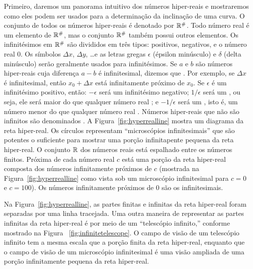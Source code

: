 \documentclass{svmono}
\begin{document}
Primeiro, daremos um panorama intuitivo dos números hiper-reais e
mostraremos como eles podem ser usados para a determinação da
inclinação de uma curva. O conjunto de todos os números hiper-reais
é denotado por ${\mathbb{R}}^\#$. Todo número real é um elemento de ${\mathbb{R}}^\#$,
mas o conjunto ${\mathbb{R}}^\#$ também possui outros elementos. Os infinitésimos
em ${\mathbb{R}}^\#$ são divididos em três tipos: positivos, negativos, e o
número real 0. Os símbolos $\Delta x$, $\Delta y$, \ldots e as letras
gregas $\epsilon$ (épsilon minúsculo) e $\delta$ (delta minúsculo)
serão geralmente usados para infinitésimos. Se $a$ e $b$ são números
hiper-reais cuja diferença $a-b$ é infinitesimal, dizemos que
.
Por exemplo, se $\Delta x$ é infinitesimal, então $x_0 + \Delta x$ está
infinitamente próximo de $x_0$. Se $\epsilon$ é um infinitésimo
positivo, então: $-\epsilon$ será um infinitésimo negativo; $1/\epsilon$
será um ,
ou seja, ele será maior do que qualquer número real%
;
e $-1/\epsilon$ será um , isto é, um número menor do que qualquer número
real%
.
Números hiper-reais que não são infinitos são denominados
. A Figura~\ref{fig:hyperrealline}
mostra um diagrama da reta hiper-real. Os círculos representam
``microscópios infinitesimais'' 
que são potentes o suficiente
para mostrar uma porção infinitapente pequena da reta hiper-real.
O conjunto $\mathbb{R}$ dos números reais está espalhado entre os
números finitos. Próxima de cada número real $c$ está uma
porção da reta hiper-real composta dos números infinitamente próximos
de $c$ (mostrada na Figura~\ref{fig:hyperrealline} como vista sob um
microscópio infinitesimal para $c = 0$ e $c = 100$). Os números
infinitamente próximos de $0$ são os infinitesimais.


Na Figura~\ref{fig:hyperrealline}, as partes finitas e
infinitas da reta hiper-real foram separadas por uma linha tracejada.
Uma outra maneira de representar as partes infinitas da reta
hiper-real é por meio de um ``telescópio infinito,''
 conforme mostrado na Figura~%
\ref{fig:infinitetelescope}. O campo de visão de um telescópio
infinito tem a mesma escala que a porção finita da reta hiper-real,
enquanto que o campo de visão de um microscópio infinitesimal
é uma visão ampliada de uma porção infinitamente pequena da reta
hiper-real.
\end{document}
